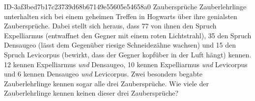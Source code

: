 \begin{exercise}
      {ID-3af3bed7b17c23739d68b67149e55605e54658a0}
      {Zaubersprüche}
  \ifproblem{} Zauberlehrlinge unterhalten sich bei einem geheimen Treffen in
    Hogwarts über ihre genialsten Zaubersprüche. Dabei stellt sich heraus,
    dass 77 von ihnen den Spruch \glqq Expelliarmus\grqq{} (entwaffnet den
    Gegner mit einem roten Lichtstrahl), 35 den Spruch \glqq Densaugeo\grqq{}
    (lässt dem Gegenüber riesige Schneidezähne wachsen) und 15 den Spruch
    \glqq Levicorpus\grqq{} (bewirkt, dass der Gegner kopfüber in der Luft
    hängt) kennen. 12 kennen \glqq Expelliarmus\grqq{} \emph{und} \glqq
    Densaugeo\grqq{}, 10 kennen \glqq Expelliarmus\grqq{} \emph{und} \glqq
    Levicorpus\grqq{} und 6 kennen \glqq Densaugeo\grqq{} \emph{und} \glqq
    Levicorpus\grqq. Zwei besonders begabte Zauberlehrlinge kennen sogar
    alle drei Zaubersprüche. Wie viele der Zauberlehrlinge kennen keinen
    dieser drei Zaubersprüche?
  \fi
\end{exercise}
